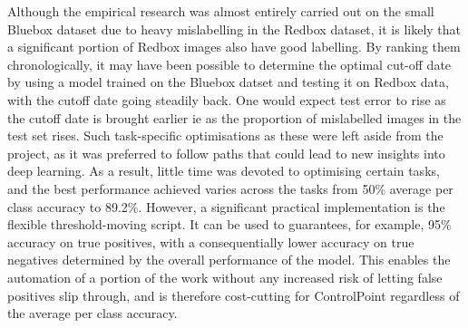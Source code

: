 \documentclass[a4paper,11pt]{article}
\begin{document}
Although the empirical research was almost entirely carried out on the small Bluebox dataset due to heavy mislabelling in the Redbox dataset, it is likely that a significant portion of Redbox images also have good labelling. By ranking them chronologically, it may have been possible to determine the optimal cut-off date by using a model trained on the Bluebox datset and testing it on Redbox data, with the cutoff date going steadily back. One would expect test error to rise as the cutoff date is brought earlier ie as the proportion of mislabelled images in the test set rises. Such task-specific optimisations as these were left aside from the project, as it was preferred to follow paths that could lead to new insights into deep learning. As a result, little time was devoted to optimising certain tasks, and the best performance achieved varies across the tasks from 50\% average per class accuracy to 89.2\%. However, a significant practical implementation is the flexible threshold-moving script. It can be used to guarantees, for example, 95\% accuracy on true positives, with a consequentially lower accuracy on true negatives determined by the overall performance of the model. This enables the automation of a portion of the work without any increased risk of letting false positives slip through, and is therefore cost-cutting for ControlPoint regardless of the average per class accuracy.\\


\clearpage
\end{document}
